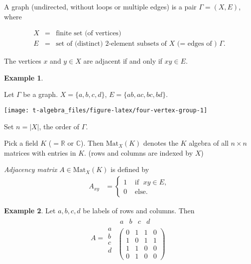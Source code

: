 \documentclass[
]{book}
\theoremstyle{definition}
\theoremstyle{definition}
\newtheorem{example}{Example}[chapter]
\theoremstyle{definition}
\theoremstyle{definition}
\theoremstyle{remark}
\begin{document}
A graph  (undirected, without loops or multiple edges) is a pair \(\Gamma = (X, E)\), where

\begin{eqnarray*}
X &=& \textrm{finite set (of vertices)}\\
E &=& \textrm{set of (distinct) 2-element subsets of }X \textrm{ (= edges of ) }\Gamma.
\end{eqnarray*}

The vertices \(x\) and \(y\in X\) are adjacent if and only if \(xy\in E\).

\begin{example}
\protect\hypertarget{exm:four-vertex-graph}{}\label{exm:four-vertex-graph}

Let \(\Gamma\) be a graph. \(X = \{a, b, c, d\}\), \(E = \{ab, ac, bc, bd\}\).

\begin{center}\texttt{[image: t-algebra\_files/figure-latex/four-vertex-group-1]} \end{center}

\end{example}

Set \(n = |X|\), the order of \(\Gamma\).

Pick a field \(K\) (\(=\mathbb{R}\) or \(\mathbb{C}\)). Then \(\mathrm{Mat}_X(K)\) denotes the \(K\) algebra of all \(n\times n\) matrices with entries in \(K\). (rows and columns are indexed by \(X\))

\emph{Adjacency matrix} \(A\in \mathrm{Mat}_X(K)\) is defined by
\begin{align}
A_{xy} & = \left\{\begin{array}{cl} 1 & \textrm{ if } \; xy\in E,\\
0 & \textrm{ else.} \end{array}\right.
\end{align}

\begin{example}
\protect\hypertarget{exm:adjacency-matrix}{}\label{exm:adjacency-matrix}Let \(a, b, c, d\) be labels of rows and columns. Then
\[A = \begin{matrix} \\ a\\ b\\c\\d\end{matrix}\begin{matrix}\begin{matrix} a & b & c & d \end{matrix}\\\begin{pmatrix} 0 & 1 & 1 & 0 \\ 1 & 0 & 1 & 1 \\
1 & 1 & 0 & 0 \\ 0 & 1 & 0 & 0 \end{pmatrix}\end{matrix}\]
\end{example}
\end{document}
